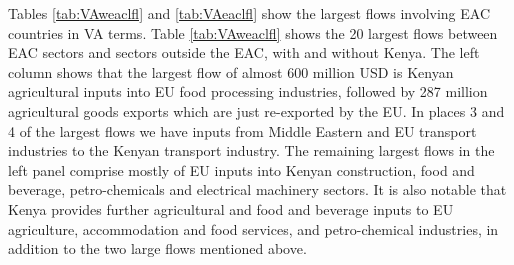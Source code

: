 \documentclass[a4paper]{article}
\begin{document}
Tables \ref{tab:VAweaclfl} and \ref{tab:VAeaclfl} show the largest flows involving EAC countries in VA terms. %
Table \ref{tab:VAweaclfl} shows the 20 largest flows between EAC sectors and sectors outside the EAC, with and without Kenya. The left column shows that the largest flow of almost 600 million USD is Kenyan agricultural inputs into EU food processing industries, followed by 287 million agricultural goods exports which are just re-exported by the EU. In places 3 and 4 of the largest flows we have inputs from Middle Eastern and EU transport industries to the Kenyan transport industry. The remaining largest flows in the left panel comprise mostly of EU inputs into Kenyan construction, food and beverage, petro-chemicals and electrical machinery sectors. It is also notable that Kenya provides further agricultural and food and beverage inputs to EU agriculture, accommodation and food services, and petro-chemical industries, in addition to the two large flows mentioned above. %
\end{document}
